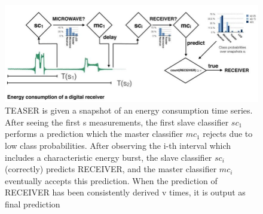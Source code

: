 \begin{figure}
    \captionsetup{justification=raggedright}
    \centering
    \includegraphics[scale = 0.65]{TEASER.JPG}
    \centering
    \caption{TEASER is given a snapshot of an energy consumption time series. After seeing the first s measurements, the first slave classifier $sc_{1}$ performs a prediction which the master classifier $mc_{1}$ rejects due to low class probabilities. After observing the i-th interval which includes a characteristic energy burst, the slave classifier $sc_{i}$ (correctly) predicts RECEIVER, and the master classifier $mc_{i}$ eventually accepts this prediction. When the prediction of RECEIVER has been consistently derived v times, it is output as final prediction  \cite{schafer2020teaser}}
    \label{Img:TEASER}
\end{figure}